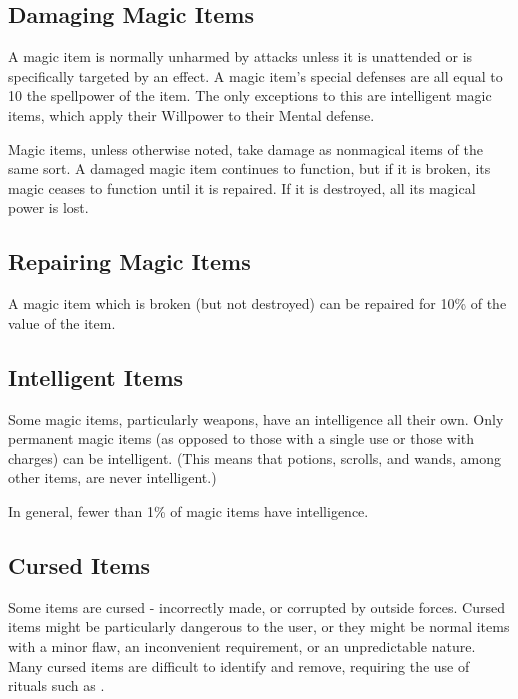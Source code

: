     \subsection{Damaging Magic Items}

        A magic item is normally unharmed by attacks unless it is unattended or is specifically targeted by an effect.
        A magic item's special defenses are all equal to 10 \add the spellpower of the item.
        The only exceptions to this are intelligent magic items, which apply their Willpower to their Mental defense.

        Magic items, unless otherwise noted, take damage as nonmagical items of the same sort.
        A damaged magic item continues to function, but if it is broken, its magic ceases to function until it is repaired.
        If it is destroyed, all its magical power is lost.

    \subsection{Repairing Magic Items}

        A magic item which is broken (but not destroyed) can be repaired for 10\% of the value of the item.

    \subsection{Intelligent Items}

        Some magic items, particularly weapons, have an intelligence all their own.
        Only permanent magic items (as opposed to those with a single use or those with charges) can be intelligent.
        (This means that potions, scrolls, and wands, among other items, are never intelligent.)

        In general, fewer than 1\% of magic items have intelligence.

    \subsection{Cursed Items}

        Some items are cursed - incorrectly made, or corrupted by outside forces.
        Cursed items might be particularly dangerous to the user, or they might be normal items with a minor flaw, an inconvenient requirement, or an unpredictable nature.
        Many cursed items are difficult to identify and remove, requiring the use of rituals such as .
